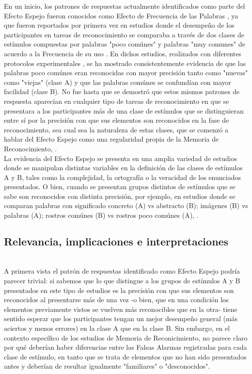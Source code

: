 En un inicio, los patrones de respuestas actualmente identificados como parte del Efecto Espejo fueron conocidos como Efecto de Frecuencia de las Palabras \parencite{Schulman1967}, ya que fueron reportados por primera vez en estudios donde el desempeño de los participantes en tareas de reconocimiento se comparaba a través de dos clases de estímulos compuestas por palabras "poco comúnes" y palabras "muy comunes" de acuerdo a la Frecuencia de su uso \parencite{Kucera1967}. En dichos estudios, realizados con diferentes protocolos experimentales \parencite{Glanzer1976, Bowles1983, Glanzer1990}, se ha mostrado consistentemente evidencia de que las palabras poco comúnes eran reconocidas con mayor precisión tanto como "nuevas" como "viejas" (clase A) y que las palabras comúnes se confundían con mayor facilidad (clase B). No fue hasta que se demostró que estos mismos patrones de respuesta aparecían en cualquier tipo de tareas de reconocimiento en que se presentara a los participantes más de una clase de estímulos que se distinguieran entre sí por la precisión con que sus elementos son reconocidos en la fase de reconocimiento, sea cual sea la naturaleza de estas clases, que se comenzó a hablar del Efecto Espejo como una regularidad propia de la Memoria de Reconocimiento, \parencite{Allen1968, Glanzer1993}.\\

La evidencia del Efecto Espejo se presenta en una amplia variedad de estudios donde se manipulan distintas variables en la definición de las clases de estímulos A y B,  tales como la complejidad, la ortografía o la veracidad de los enunciados presentados. O bien, cuando se presentan grupos distintos de estímulos que se sabe son reconocidos con distinta precisión, por ejemplo, en estudios donde se comparan palabras con significado concreto (A) vs abstracto (B); imágenes (B) vs palabras (A); rostros comúnes (B) vs rostros poco comúnes (A), \parencite{Glanzer1993, Greene1996, Glanzer1998}.\\

\subsection{Relevancia, implicaciones e interpretaciones}\\

A primera vista el patrón de respuestas identificado como Efecto Espejo podría parecer trivial: si sabemos que lo que distingue a los grupos de estímulos A y B presentados en este tipo de estudios es la precisión con que sus elementos son reconocidos al presentarse más de una vez -o bien, que en una condición los elementos previamente vistos se vuelven más reconocibles que en la otra- tiene sentido esperar que los participantes tengan un mejor desempeño general (más aciertos y menos errores) en la clase A que en la clase B. Sin embargo, en el contexto específico de los estudios de Memoria de Reconicimiento, no parece claro por qué deberían haber diferencias entre las Falsas Alarmas registradas para cada clase de estímulo, en tanto que se trata de elementos que no han sido presentados antes y deberían de resultar igualmente "familiares" o "desconocidos".\\

